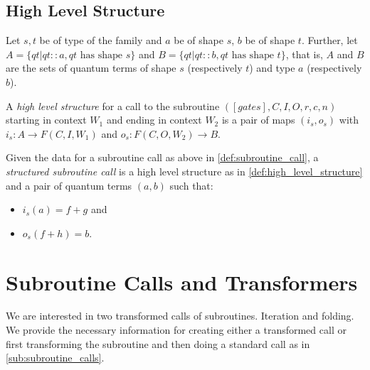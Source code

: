 
\subsection{High Level Structure} %
\label{sub:high_level_structure}

Let $s,t$ be of type of the family 
and $a$ be of shape $s$, $b$ be of shape $t$.
Further, let $A = \{qt|qt::a, qt \text{ has shape }s\}$
and $B = \{qt|qt::b, qt \text{ has shape }t\}$, that is,
$A$ and $B$ are the sets of quantum terms of shape $s$
(respectively $t$) and type $a$ (respectively $b$).

\begin{definition}\label{def:high_level_structure}
  A \emph{high level structure} for a call to the subroutine
  $([gates],C,I,O,r,c,n)$ starting in context $W_1$ and
  ending in context $W_2$ is a
  pair of maps $(i_s,o_s)$ with $i_s:A \to F(C,I,W_1)$
  and $o_s:F(C,O,W_2)\to B$.
\end{definition}

\begin{definition}\label{def:structured_subroutine_call}
  Given the data for a subroutine call as above in 
  \vref{def:subroutine_call}, a \emph{structured subroutine call} is a
  high level structure as in \vref{def:high_level_structure}
  and a pair of quantum terms $(a,b)$ such that:
  \begin{itemize}
    \item $i_s(a) = f+g$ and
    \item $o_s(f+h) = b$.
  \end{itemize}

\end{definition}



\section{Subroutine Calls and Transformers} %
\label{sec:subroutine_calls_and_transformers}

We are interested in two transformed calls of subroutines. Iteration and
folding. We provide the necessary information for creating either a
transformed call or first transforming the subroutine and then doing a
standard call as in \vref{sub:subroutine_calls}.

